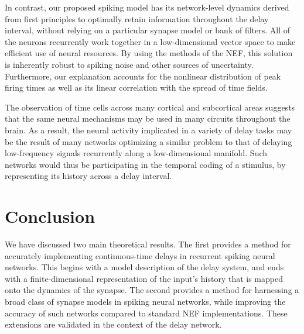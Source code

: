 \documentclass[12pt]{article}
\theoremstyle{definition}
\begin{document}
In contrast, our proposed spiking model has its network-level dynamics derived from first principles to optimally retain information throughout the delay interval, without relying on a particular synapse model or bank of filters.
All of the neurons recurrently work together in a low-dimensional vector space to make efficient use of neural resources.
By using the methods of the NEF, this solution is inherently robust to spiking noise and other sources of uncertainty.
Furthermore, our explanation accounts for the nonlinear distribution of peak firing times as well as its linear correlation with the spread of time fields.

The observation of time cells across many cortical and subcortical areas suggests that the same neural mechanisms may be used in many circuits throughout the brain.
As a result, the neural activity implicated in a variety of delay tasks may be the result of many networks optimizing a similar problem to that of delaying low-frequency signals recurrently along a low-dimensional manifold.
Such networks would thus be participating in the temporal coding of a stimulus, by representing its history across a delay interval.

\section*{Conclusion}

We have discussed two main theoretical results.
The first provides a method for accurately implementing continuous-time delays in recurrent spiking neural networks.
This begins with a model description of the delay system, and ends with a finite-dimensional representation of the input's history that is mapped onto the dynamics of the synapse.
The second provides a method for harnessing a broad class of synapse models in spiking neural networks, while improving the accuracy of such networks compared to standard NEF implementations.
These extensions are validated in the context of the delay network.
\end{document}
